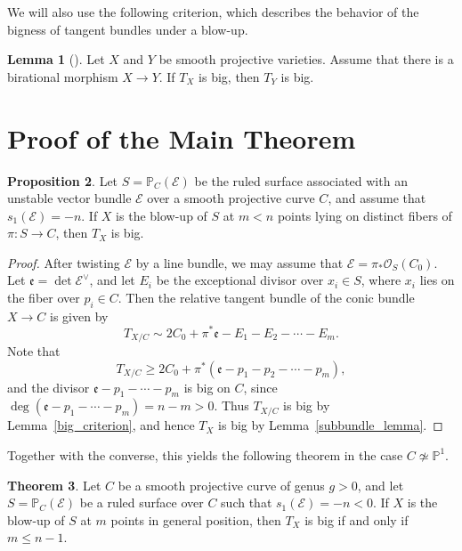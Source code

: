 \documentclass[reqno]{amsart}
\theoremstyle{definition}
\newtheorem{Thm}{Theorem}[section]
\newtheorem{Prop}[Thm]{Proposition}
\newtheorem{Lemma}[Thm]{Lemma}
\newcommand{\PP}{\mathbb{P}}
\newcommand{\Ee}{\mathcal{E}}
\newcommand{\Oo}{\mathcal{O}}
\newcommand{\tS}{X}
\begin{document}
We will also use the following criterion, which describes the behavior of the bigness of tangent bundles under a blow-up.

\begin{Lemma}[{\cite[Lemma 2.4]{HLS22}}]\label{blow-up}
Let $X$ and $Y$ be smooth projective varieties.
Assume that there is a birational morphism $X\to Y$.
If $T_X$ is big, then $T_Y$ is big.
\end{Lemma}


\section{Proof of the Main Theorem}

\begin{Prop}\label{big}
Let $S=\PP_C(\Ee)$ be the ruled surface associated with an unstable vector bundle $\Ee$ over a smooth projective curve $C$, and assume that $s_1(\Ee)=-n$.
If $\tS$ is the blow-up of $S$ at $m<n$ points lying on distinct fibers of $\pi: S\to C$, then $T_X$ is big.
\end{Prop}

\begin{proof}
After twisting $\Ee$ by a line bundle, we may assume that $\Ee=\pi_*\Oo_S(C_0)$.
Let $\mathfrak{e}=\det \Ee^\vee$, and let $E_i$ be the exceptional divisor over $x_i\in S$, where $x_i$ lies on the fiber over $p_i\in C$.
Then the relative tangent bundle of the conic bundle $\tS\to C$ is given by
\[
T_{\tS/C}\sim 2C_0+\pi^*\mathfrak{e}-E_1-E_2-\cdots-E_m.
\]
Note that
\[
T_{\tS/C}
\geq 2C_0+\pi^*(\mathfrak{e}-p_1-p_2-\cdots-p_m),
\]
and the divisor $\mathfrak{e}-p_1-\cdots-p_m$ is big on $C$, since $\deg(\mathfrak{e}-p_1-\cdots-p_m)=n-m>0$.
Thus $T_{\tS/C}$ is big by Lemma~\ref{big_criterion}, and hence $T_{\tS}$ is big by Lemma~\ref{subbundle_lemma}.
\end{proof}

Together with the converse, this yields the following theorem in the case $C\not\simeq \PP^1$.

\begin{Thm}\label{positive-genus}
Let $C$ be a smooth projective curve of genus $g>0$, and let $S=\PP_C(\Ee)$ be a ruled surface over $C$ such that $s_1(\Ee)=-n<0$.
If $\tS$ is the blow-up of $S$ at $m$ points in general position, then $T_{\tS}$ is big if and only if $m\leq n-1$. 
\end{Thm}
\end{document}
